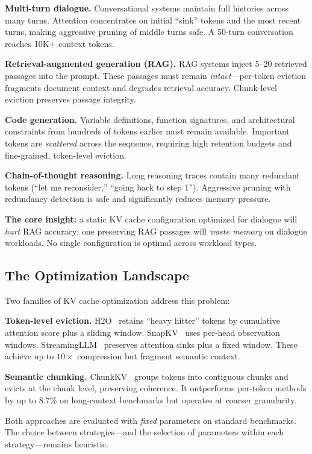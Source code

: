 \documentclass[conference]{IEEEtran}
\begin{document}
\textbf{Multi-turn dialogue.} Conversational systems maintain full histories across many turns. Attention concentrates on initial ``sink'' tokens and the most recent turns, making aggressive pruning of middle turns safe. A 50-turn conversation reaches 10K+ context tokens.

\textbf{Retrieval-augmented generation (RAG).} RAG systems inject 5--20 retrieved passages into the prompt. These passages must remain \textit{intact}---per-token eviction fragments document context and degrades retrieval accuracy. Chunk-level eviction preserves passage integrity.

\textbf{Code generation.} Variable definitions, function signatures, and architectural constraints from hundreds of tokens earlier must remain available. Important tokens are \textit{scattered} across the sequence, requiring high retention budgets and fine-grained, token-level eviction.

\textbf{Chain-of-thought reasoning.} Long reasoning traces contain many redundant tokens (``let me reconsider,'' ``going back to step 1''). Aggressive pruning with redundancy detection is safe and significantly reduces memory pressure.

\textbf{The core insight:} a static KV cache configuration optimized for dialogue will \textit{hurt} RAG accuracy; one preserving RAG passages will \textit{waste memory} on dialogue workloads. No single configuration is optimal across workload types.

\subsection{The Optimization Landscape}

Two families of KV cache optimization address this problem:

\textbf{Token-level eviction.} H2O~\cite{h2o} retains ``heavy hitter'' tokens by cumulative attention score plus a sliding window. SnapKV~\cite{snapkv} uses per-head observation windows. StreamingLLM~\cite{streamingllm} preserves attention sinks plus a fixed window. These achieve up to $10\times$ compression but fragment semantic context.

\textbf{Semantic chunking.} ChunkKV~\cite{chunkkv} groups tokens into contiguous chunks and evicts at the chunk level, preserving coherence. It outperforms per-token methods by up to 8.7\% on long-context benchmarks but operates at coarser granularity.

Both approaches are evaluated with \textit{fixed} parameters on standard benchmarks. The choice between strategies---and the selection of parameters within each strategy---remains heuristic.
\end{document}
